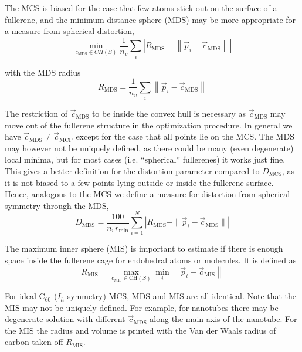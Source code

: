 \documentclass[article,a4paper,twoside]{memoir}
\newcommand{\C}[1]{\ensuremath{\mathrm{C}_{#1}}}
\begin{document}
The MCS is biased for the case that few atoms stick out on the surface of a fullerene,
and the minimum distance sphere (MDS) may be more appropriate for a measure from spherical distortion,
\begin{equation} 
\min\limits_{c_\mathrm{MDS} \in CH(S)} \frac{1}{n_v} \sum _{i} \left|R_\mathrm{MDS} -\left\| \vec{p}_{i}-\vec{c}_\mathrm{MDS} \right\| \right|  
\end{equation}

with the MDS radius
\begin{equation} 
	R_{\mathrm{MDS}} =\frac{1}{n_v} \sum _{i}\left\| \vec{p}_{i} -\vec{c}_{\mathrm{MDS}} \right\|   
	\label{eq:RMDS}
\end{equation} 

The restriction of $\vec{c}_{\mathrm{MDS}}$ to be inside the convex hull is necessary as $\vec{c}_{\mathrm{MDS}}$ may move
out of the fullerene structure in the optimization procedure.  In general we have $\vec{c}_{\mathrm{MDS}}\ne\vec{c}_{\mathrm{MCP}}$
except for the case that all points lie on the MCS. The MDS may however not be uniquely defined, as there could be many 
(even degenerate) local minima, but for most cases (i.e. ``spherical'' fullerenes) it works just fine.  
This gives a better definition for the distortion
parameter compared to $D_{\mathrm{MCS}}$, as it is not biased to a few points lying outside or inside the fullerene surface.
Hence, analogous to the MCS we define a measure for distortion from spherical symmetry through the MDS,
\begin{equation}
  \label{eq:DMDS}
  D_{\mathrm{MDS}} = \frac{100}{n_v r_{\mathrm{min}}} \sum_{i=1}^N \left|R_{\mathrm{MDS}} - \|\vec{p}_i - \vec{c}_{\mathrm{MDS}}\| \right|
\end{equation}

The maximum inner sphere (MIS) is important to estimate if there is enough space inside the fullerene cage for endohedral atoms or molecules. It is
defined as
\begin{equation}
	R_{\mathrm{MIS}} = \max\limits_{c_{\mathrm{MIS}} \in \mathrm{CH}(S)} \min\limits_{i} \left\| \vec{p}_{i} -\vec{c}_{\mathrm{MIS}} \right\|  
	\label{MES} 
\end{equation}

For ideal \C{60} ($I_h$ symmetry) MCS, MDS and MIS are all identical. Note that the MIS may not be uniquely defined. For example, for nanotubes
there may be degenerate solution with different $\vec{c}_{\mathrm{MDS}}$ along the main axis of the nanotube.
For the MIS the radius and volume is printed  with the Van der Waals radius of carbon taken off $R_{\mathrm{MIS}}$. 
\end{document}
